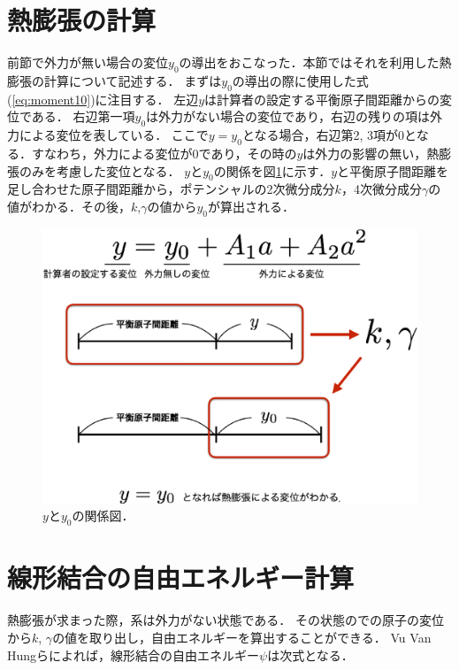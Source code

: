 \section{熱膨張の計算}
\label{sec:heatexpantion} 
前節で外力が無い場合の変位$y_0$の導出をおこなった．本節ではそれを利用した熱膨張の計算について記述する．
まずは$y_0$の導出の際に使用した式(\ref{eq:moment10})に注目する．
左辺$y$は計算者の設定する平衡原子間距離からの変位である．
右辺第一項$y_0$は外力がない場合の変位であり，右辺の残りの項は外力による変位を表している．
ここで$y=y_0$となる場合，右辺第2, 3項が0となる．すなわち，外力による変位が0であり，その時の$y$は外力の影響の無い，熱膨張のみを考慮した変位となる．
$y$と$y_0$の関係を図\ref{fig:yy0}に示す．$y$と平衡原子間距離を足し合わせた原子間距離から，ポテンシャルの2次微分成分$k$，4次微分成分$\gamma$の値がわかる．その後，$k$,$\gamma$の値から$y_0$が算出される．

\begin{figure}[htbp]
 \begin{center}
  \includegraphics[width=130mm]{../image/fig1.eps}
 \end{center}
 \caption{$y$と$y_0$の関係図．}
 \label{fig:yy0}
\end{figure}


\section{線形結合の自由エネルギー計算}
熱膨張が求まった際，系は外力がない状態である．
その状態のでの原子の変位から$k$, $\gamma$の値を取り出し，自由エネルギーを算出することができる．
Vu Van Hungらによれば，線形結合の自由エネルギー$\psi$は次式となる\cite[p.515]{jindo2}．

